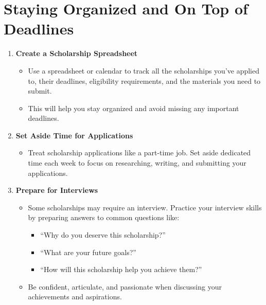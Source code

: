 \documentclass[
  letterpaper,
  DIV=11,
  numbers=noendperiod]{scrreprt}
\providecommand{\tightlist}{%
  \setlength{\itemsep}{0pt}\setlength{\parskip}{0pt}}\usepackage{longtable,booktabs,array}
\begin{document}
\section{Staying Organized and On Top of
Deadlines}\label{staying-organized-and-on-top-of-deadlines}

\begin{enumerate}
\def\labelenumi{\arabic{enumi}.}
\item
  \textbf{Create a Scholarship Spreadsheet}

  \begin{itemize}
  \tightlist
  \item
    Use a spreadsheet or calendar to track all the scholarships you've
    applied to, their deadlines, eligibility requirements, and the
    materials you need to submit.
  \item
    This will help you stay organized and avoid missing any important
    deadlines.
  \end{itemize}
\item
  \textbf{Set Aside Time for Applications}

  \begin{itemize}
  \tightlist
  \item
    Treat scholarship applications like a part-time job. Set aside
    dedicated time each week to focus on researching, writing, and
    submitting your applications.
  \end{itemize}
\item
  \textbf{Prepare for Interviews}

  \begin{itemize}
  \item
    Some scholarships may require an interview. Practice your interview
    skills by preparing answers to common questions like:

    \begin{itemize}
    \tightlist
    \item
      ``Why do you deserve this scholarship?''
    \item
      ``What are your future goals?''
    \item
      ``How will this scholarship help you achieve them?''
    \end{itemize}
  \item
    Be confident, articulate, and passionate when discussing your
    achievements and aspirations.
  \end{itemize}
\end{enumerate}
\end{document}
